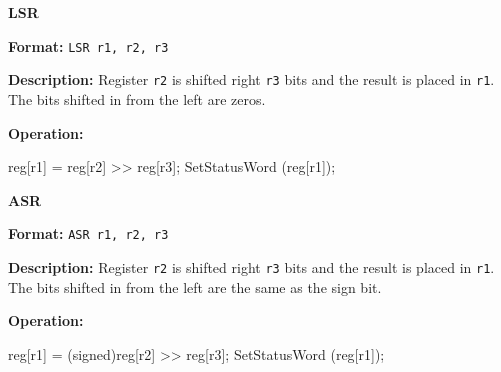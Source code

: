 \noindent\textsf{\textbf{\Large LSR}}\par
{}\par\begin{indented}{\bf Format:}
{\tt LSR r1, r2, r3}\par\vspace{3ex}
\end{indented}\vspace{4ex}
\begin{indented}{\bf Description:}
Register {\tt r2} is shifted right {\tt r3} bits and the result is placed
in {\tt r1}.  The bits shifted in from the left are zeros.
\end{indented}
\begin{indented}{\bf Operation:}\vspace{.8ex}
\begin{verbatimtab}
reg[r1] = reg[r2] >> reg[r3];
SetStatusWord (reg[r1]);
\end{verbatimtab}
\end{indented}
\vspace{2em}

\newpage
\noindent\textsf{\textbf{\Large ASR}}\par
{}\par\begin{indented}{\bf Format:}
{\tt ASR r1, r2, r3}\par\vspace{3ex}
\end{indented}\vspace{4ex}
\begin{indented}{\bf Description:}
Register {\tt r2} is shifted right {\tt r3} bits and the result is placed
in {\tt r1}.  The bits shifted in from the left are the same as the sign
bit.
\end{indented}
\begin{indented}{\bf Operation:}\vspace{.8ex}
\begin{verbatimtab}
reg[r1] = (signed)reg[r2] >> reg[r3];
SetStatusWord (reg[r1]);
\end{verbatimtab}
\end{indented}
\vspace{2em}

